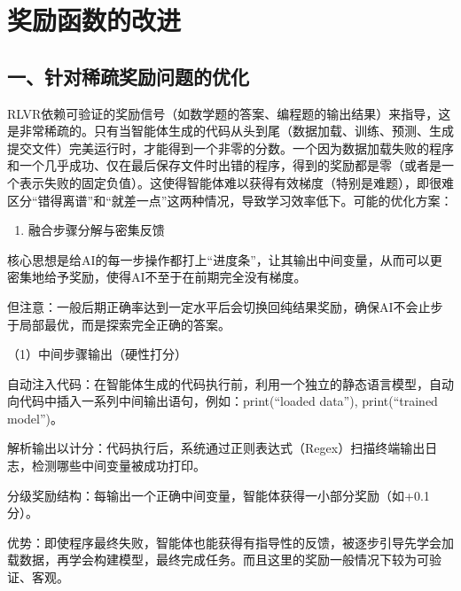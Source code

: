 \setcounter{section}{4}

\hypertarget{ux5956ux52b1ux51fdux6570ux7684ux6539ux8fdb}{%
\section{奖励函数的改进}\label{ux5956ux52b1ux51fdux6570ux7684ux6539ux8fdb}}

\hypertarget{ux4e00ux9488ux5bf9ux7a00ux758fux5956ux52b1ux95eeux9898ux7684ux4f18ux5316}{%
\subsection{一、针对稀疏奖励问题的优化}\label{ux4e00ux9488ux5bf9ux7a00ux758fux5956ux52b1ux95eeux9898ux7684ux4f18ux5316}}

RLVR依赖可验证的奖励信号（如数学题的答案、编程题的输出结果）来指导，这是非常稀疏的。只有当智能体生成的代码从头到尾（数据加载、训练、预测、生成提交文件）完美运行时，才能得到一个非零的分数。一个因为数据加载失败的程序和一个几乎成功、仅在最后保存文件时出错的程序，得到的奖励都是零（或者是一个表示失败的固定负值）。这使得智能体难以获得有效梯度（特别是难题），即很难区分``错得离谱''和``就差一点''这两种情况，导致学习效率低下。可能的优化方案：

\begin{enumerate}
\def\labelenumi{\arabic{enumi}.}
\tightlist
\item
  融合步骤分解与密集反馈
\end{enumerate}

核心思想是给AI的每一步操作都打上``进度条''，让其输出中间变量，从而可以更密集地给予奖励，使得AI不至于在前期完全没有梯度。

但注意：一般后期正确率达到一定水平后会切换回纯结果奖励，确保AI不会止步于局部最优，而是探索完全正确的答案。

（1）中间步骤输出（硬性打分）

自动注入代码：在智能体生成的代码执行前，利用一个独立的静态语言模型，自动向代码中插入一系列中间输出语句，例如：print(``loaded data''), print(``trained model'')。

解析输出以计分：代码执行后，系统通过正则表达式（Regex）扫描终端输出日志，检测哪些中间变量被成功打印。

分级奖励结构：每输出一个正确中间变量，智能体获得一小部分奖励（如+0.1分）。

优势：即使程序最终失败，智能体也能获得有指导性的反馈，被逐步引导先学会加载数据，再学会构建模型，最终完成任务。而且这里的奖励一般情况下较为可验证、客观。

